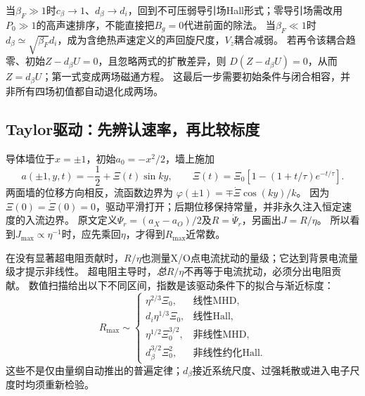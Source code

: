 当$\beta_F\gg1$时$c_\beta\to1$、$d_\beta\to d_i$，回到不可压弱导引场Hall形式；零导引场需改用$P_0\gg1$的高声速排序，不能直接把$B_g=0$代进前面的除法。
当$\beta_F\ll1$时$d_\beta\simeq\sqrt{\beta_F}d_i$，成为含绝热声速定义的声回旋尺度，$V_z$耦合减弱。
若再令该耦合趋零、初始$Z-d_\beta U=0$，且忽略两式的扩散差异，则
$D(Z-d_\beta U)=0$，从而$Z=d_\beta U$；第一式变成两场磁通方程。
这最后一步需要初始条件与闭合相容，并非所有四场初值都自动退化成两场。


\subsection{Taylor驱动：先辨认速率，再比较标度}
导体墙位于$x=\pm1$，初始$a_0=-x^2/2$，墙上施加
\begin{equation}
 a(\pm1,y,t)=-\frac12+\Xi(t)\sin ky,\qquad
 \Xi(t)=\Xi_0[1-(1+t/\tau)e^{-t/\tau}].
\end{equation}
两面墙的位移方向相反，流函数边界为
$\varphi(\pm1)=\mp\dot\Xi\cos(ky)/k$。
因为$\Xi(0)=\dot\Xi(0)=0$，驱动平滑打开；后期位移保持常量，并非永久注入恒定速度的入流边界。
原文定义$\Psi_r=(a_X-a_O)/2$及$R=\dot\Psi_r$，另画出$J=R/\eta$。
所以看到$J_{\max}\propto\eta^{-1}$时，应先乘回$\eta$，才得到$R_{\max}$近常数。

在没有显著超电阻贡献时，$R/\eta$也测量X/O点电流扰动的量级；它达到背景电流量级才提示非线性。
超电阻主导时，\emph{总}$R/\eta$不再等于电流扰动，必须分出电阻贡献。
数值扫描给出以下不同区间，指数是该驱动条件下的拟合与渐近标度：
\begin{equation}
 R_{\max}\sim
 \begin{cases}
 \eta^{2/3}\Xi_0,&\text{线性MHD},\\
 d_i\eta^{1/3}\Xi_0,&\text{线性Hall},\\
 \eta^{1/2}\Xi_0^{3/2},&\text{非线性MHD},\\
 d_\beta^{3/2}\Xi_0^2,&\text{非线性约化Hall}.
 \end{cases}
\end{equation}
这些不是仅由量纲自动推出的普遍定律；$d_\beta$接近系统尺度、过强耗散或进入电子尺度时均须重新检验。

